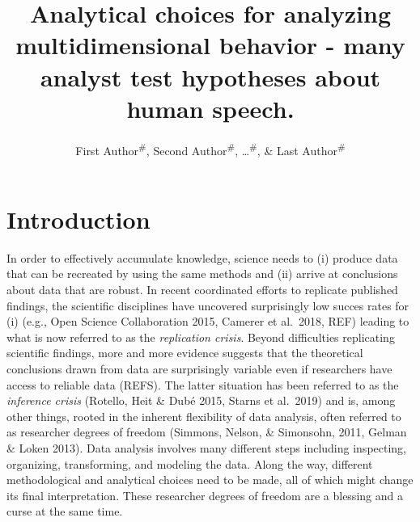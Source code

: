 \documentclass[
  english,
  man]{apa6}
\title{Analytical choices for analyzing multidimensional behavior - many analyst test hypotheses about human speech.}
\author{First Author\textsuperscript{\#}, Second Author\textsuperscript{\#}, \ldots{}\textsuperscript{\#}, \& Last Author\textsuperscript{\#}}
\date{}
\affiliation{\vspace{0.5cm}\textsuperscript{1} \#\\\textsuperscript{\ldots{}} \ldots{}}
\begin{document}
\maketitle

\hypertarget{introduction}{%
\section{Introduction}\label{introduction}}

In order to effectively accumulate knowledge, science needs to (i) produce data that can be recreated by using the same methods and (ii) arrive at conclusions about data that are robust. In recent coordinated efforts to replicate published findings, the scientific disciplines have uncovered surprisingly low succes rates for (i) (e.g., Open Science Collaboration 2015, Camerer et al.~2018, REF) leading to what is now referred to as the \emph{replication crisis}. Beyond difficulties replicating scientific findings, more and more evidence suggests that the theoretical conclusions drawn from data are surprisingly variable even if researchers have access to reliable data (REFS). The latter situation has been referred to as the \emph{inference crisis} (Rotello, Heit \& Dubé 2015, Starns et al.~2019) and is, among other things, rooted in the inherent flexibility of data analysis, often referred to as researcher degrees of freedom (Simmons, Nelson, \& Simonsohn, 2011, Gelman \& Loken 2013). Data analysis involves many different steps including inspecting, organizing, transforming, and modeling the data. Along the way, different methodological and analytical choices need to be made, all of which might change its final interpretation. These researcher degrees of freedom are a blessing and a curse at the same time.
\end{document}
